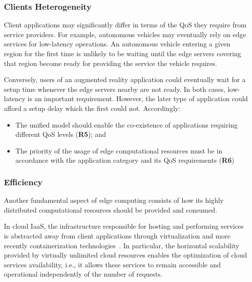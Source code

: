 
\subsubsection{Clients Heterogeneity}

Client applications may significantly differ in terms of the QoS they require from service providers. For example, autonomous vehicles may eventually rely on edge services for low-latency operations. An autonomous vehicle entering a given region for the first time is unlikely to be waiting until the edge servers covering that region become ready for providing the service the vehicle requires. 

Conversely, users of an augmented reality application could eventually wait for a setup time whenever the edge servers nearby are not ready. In both cases, low-latency is an important requirement. However, the later type of application could afford a setup delay which the first could not. Accordingly:

\begin{itemize}
\item The unified model should enable the co-existence of applications requiring different QoS levels (\textbf{R5}); and

\item The priority of the usage of edge computational resources must be in accordance with the application category and its QoS requirements (\textbf{R6})
\end{itemize}


\subsubsection{Efficiency}

Another fundamental aspect of edge computing consists of how its highly distributed computational resources should be provided and consumed.

In cloud IaaS, the infrastructure responsible for hosting and performing services is abstracted away from client applications through virtualization and more recently containerization technologies~\cite{}. In particular, the horizontal scalability provided by virtually unlimited cloud resources enables the optimization of cloud services availability, i.e., it allows these services to remain accessible and operational independently of the number of requests.

